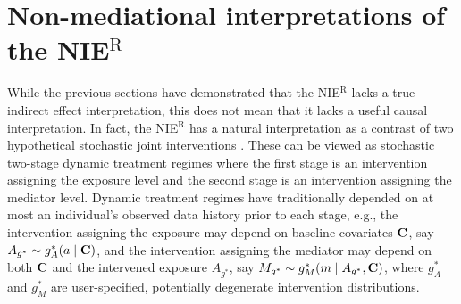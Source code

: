 \documentclass[12pt]{article}
\newtheorem{theorem}{Theorem}
\def\ci{\mbox{\ensuremath{\perp\!\!\!\perp}}}
\begin{document}
\begin{comment}
Another way the sharp(er) null criterion can be recovered is if %
$M$ affects $Y$ for every individual. 
\begin{theorem}
    \label{thm:m-always-affects-y}
    Suppose that for each subject $i$, either $Y_i(a^*,m)\neq Y_i(a^*,m')$ or $Y_i(a,m)\neq Y_i(a,m')$ for all $m$ and $m'$ in the support of $M$. Then under the FFRCISTG corresponding to the DAG in Figure \ref{fig:DAG1}, the NIE$^{\text{R}}$ satisfies both the sharp null and sharper null criteria.
\end{theorem}
In this case, the NIE is not nonparametrically identified, so the NIE$^{\text{R}}$ does hold an advantage over the NIE as an indirect effect measure in this setting. However, it seems unlikely in most practical applications that one would have knowledge that there is an effect of $M$ on $Y$ for each individual.
\end{comment}

\begin{comment}
\begin{align*}
        \text{NIE}^{\text{R}} =
        E\left[Y\{a,M(a)\}\right] - E\left[Y\{a,G(a^*\mid C)\}\right]
        \neq 0.
\end{align*}
\end{comment}

\section{Non-mediational interpretations of the NIE$^{\text{R}}$}
\label{sec:interpretations}

While the previous sections have demonstrated that the NIE$^{\text{R}}$ lacks a true indirect effect interpretation, this does not mean that it lacks a useful causal interpretation. In fact, the NIE$^{\text{R}}$ has a natural interpretation as a contrast of two hypothetical stochastic joint interventions \citep{didelez2006direct,geneletti2007identifying}. These can be viewed as stochastic two-stage dynamic treatment regimes where the first stage is an intervention assigning the exposure level and the second stage is an intervention assigning the mediator level. Dynamic treatment regimes have traditionally depended on at most an individual's observed data history prior to each stage, e.g., the intervention assigning the exposure may depend on baseline covariates ${\bf C}$, say $A_{g^*}\sim g_A^*(a\mid {\bf C})$, and the intervention assigning the mediator may depend on both ${\bf C}$ and the intervened exposure $A_{g^*}$, say $M_{g^*}\sim g_M^*(m\mid A_{g^*}, {\bf C})$, where $g_A^*$ and $g_M^*$ are user-specified, potentially degenerate intervention distributions. %
\end{document}
